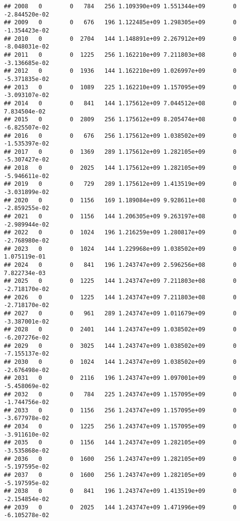 \documentclass[
]{article}
\begin{document}
\begin{enumerate}
\begin{verbatim}
## 2008   0        0   784   256 1.109390e+09 1.551344e+09        0 -2.844520e-02
## 2009   0        0   676   196 1.122485e+09 1.298305e+09        0 -1.354423e-02
## 2010   0        0  2704   144 1.148891e+09 2.267912e+09        0 -8.048031e-02
## 2011   0        0  1225   256 1.162210e+09 7.211803e+08        0 -3.136685e-02
## 2012   0        0  1936   144 1.162210e+09 1.026997e+09        0 -5.371835e-02
## 2013   0        0  1089   225 1.162210e+09 1.157095e+09        0 -3.093107e-02
## 2014   0        0   841   144 1.175612e+09 7.044512e+08        0  7.834504e-02
## 2015   0        0  2809   256 1.175612e+09 8.205474e+08        0 -6.825507e-02
## 2016   0        0   676   256 1.175612e+09 1.038502e+09        0 -1.535397e-02
## 2017   0        0  1369   289 1.175612e+09 1.282105e+09        0 -5.307427e-02
## 2018   0        0  2025   144 1.175612e+09 1.282105e+09        0 -5.946611e-02
## 2019   0        0   729   289 1.175612e+09 1.413519e+09        0 -3.031899e-02
## 2020   0        0  1156   169 1.189084e+09 9.928611e+08        0 -2.859255e-02
## 2021   0        0  1156   144 1.206305e+09 9.263197e+08        0 -2.989944e-02
## 2022   0        0  1024   196 1.216259e+09 1.280817e+09        0 -2.768980e-02
## 2023   0        0  1024   144 1.229968e+09 1.038502e+09        0  1.075119e-01
## 2024   0        0   841   196 1.243747e+09 2.596256e+08        0  7.822734e-03
## 2025   0        0  1225   144 1.243747e+09 7.211803e+08        0 -2.718170e-02
## 2026   0        0  1225   144 1.243747e+09 7.211803e+08        0 -2.718170e-02
## 2027   0        0   961   289 1.243747e+09 1.011679e+09        0 -3.387001e-02
## 2028   0        0  2401   144 1.243747e+09 1.038502e+09        0 -6.207276e-02
## 2029   0        0  3025   144 1.243747e+09 1.038502e+09        0 -7.155137e-02
## 2030   0        0  1024   144 1.243747e+09 1.038502e+09        0 -2.676498e-02
## 2031   0        0  2116   196 1.243747e+09 1.097001e+09        0 -5.458069e-02
## 2032   0        0   784   225 1.243747e+09 1.157095e+09        0 -1.744756e-02
## 2033   0        0  1156   256 1.243747e+09 1.157095e+09        0 -3.677978e-02
## 2034   0        0  1225   256 1.243747e+09 1.157095e+09        0 -3.911610e-02
## 2035   0        0  1156   144 1.243747e+09 1.282105e+09        0 -3.535868e-02
## 2036   0        0  1600   256 1.243747e+09 1.282105e+09        0 -5.197595e-02
## 2037   0        0  1600   256 1.243747e+09 1.282105e+09        0 -5.197595e-02
## 2038   0        0   841   196 1.243747e+09 1.413519e+09        0 -2.154854e-02
## 2039   0        0  2025   144 1.243747e+09 1.471996e+09        0 -6.105278e-02

\end{verbatim}
\end{enumerate}
\end{document}
